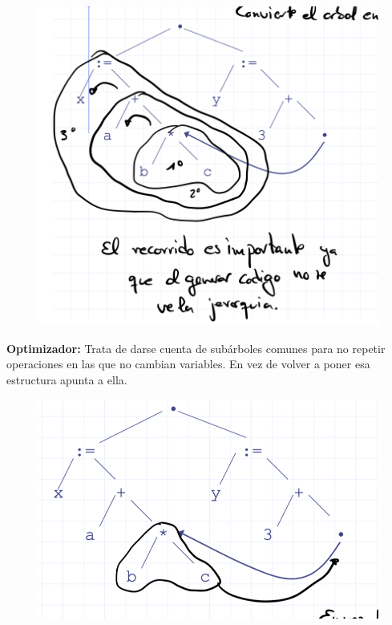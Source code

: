 \documentclass[12pt]{report} %
\begin{document}
\begin{figure}[H]
	{\includegraphics[scale=.25]{Untitled 14.png}}
\end{figure}

\textbf{Optimizador:} Trata de darse cuenta de subárboles comunes para
no repetir operaciones en las que no cambian variables. En vez de volver
a poner esa estructura apunta a ella.

\begin{figure}[H]
	{\includegraphics[scale=.3]{Untitled 15.png}}
\end{figure}
\end{document}
